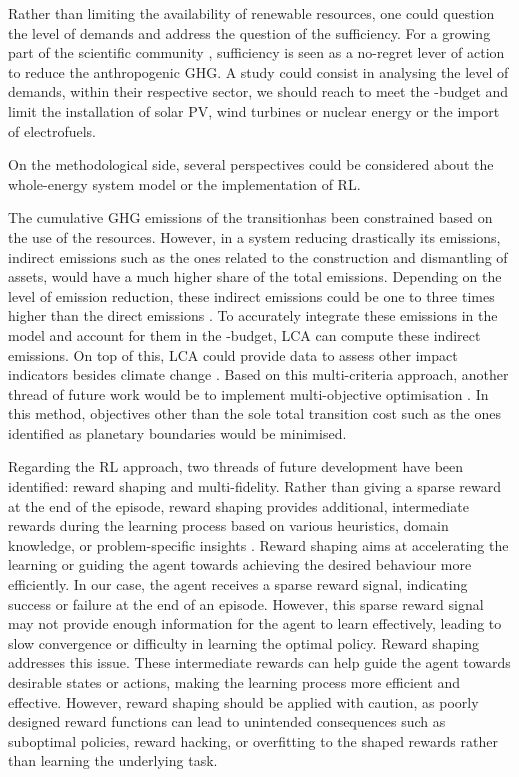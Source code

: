 Rather than limiting the availability of renewable resources, one could question the level of demands and address the question of the sufficiency. For a growing part of the scientific community \cite{o2018good}, sufficiency is seen as a no-regret lever of action to reduce the anthropogenic \gls{GHG}. A study could consist in analysing the level of demands, within their respective sector, we should reach to meet the -budget and limit the installation of solar PV, wind turbines or nuclear energy or the import of electrofuels.

On the methodological side, several perspectives could be considered about the whole-energy system model or the implementation of \gls{RL}.

The cumulative \acrfull{GHG} emissions of the transitionhas been constrained based on the use of the resources. However, in a system reducing drastically its emissions, indirect emissions such as the ones related to the construction and dismantling of assets, would have a much higher share of the total emissions. Depending on the level of emission reduction, these indirect emissions could be one to three times higher than the direct emissions \cite{blanco2020life}. To accurately integrate these emissions in the model and account for them in the -budget, \gls{LCA} can compute these indirect emissions. On top of this, \gls{LCA} could provide data to assess other impact indicators besides climate change \cite{astudillo2018integrating}. Based on this multi-criteria approach, another thread of future work would be to implement multi-objective optimisation \cite{dubois2023multi}. In this method, objectives other than the sole total transition cost such as the ones identified as planetary boundaries \cite{richardson2023earth} would be minimised.

Regarding the \gls{RL} approach, two threads of future development have been identified: reward shaping and multi-fidelity.  Rather than giving a sparse reward at the end of the episode, reward shaping provides additional, intermediate rewards during the learning process based on various heuristics, domain knowledge, or problem-specific insights \cite{hu2020learning}. Reward shaping aims at accelerating the learning or guiding the agent towards achieving the desired behaviour more efficiently. In our case, the agent receives a sparse reward signal, indicating success or failure at the end of an episode. However, this sparse reward signal may not provide enough information for the agent to learn effectively, leading to slow convergence or difficulty in learning the optimal policy. Reward shaping addresses this issue. These intermediate rewards can help guide the agent towards desirable states or actions, making the learning process more efficient and effective. However, reward shaping should be applied with caution, as poorly designed reward functions can lead to unintended consequences such as suboptimal policies, reward hacking, or overfitting to the shaped rewards rather than learning the underlying task.  

